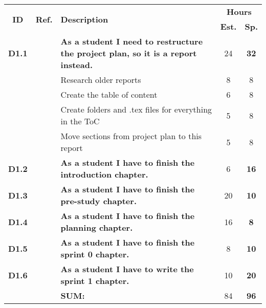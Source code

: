 \label{tab:sprint1Documentationstories}
\def\arraystretch{1.25}
 
\begin{longtable}{ccXcc}

\toprule[0.5mm]
\multirow{2}{*}{\textbf{ID}} &
\multirow{2}{*}{\textbf{Ref.}} & \multirow{2}{*}{\textbf{Description}} & \multicolumn{2}{c}{\textbf{Hours}} \\
 					& & & \textbf{Est.} & \textbf{Sp.} \\
\midrule
\textbf{D1.1} 	&& {\bf As a student I need to restructure the project plan, so it is a report instead.}	& 	 	24	& \textbf{32} \\
			&& Research older reports 										& 8	& 8\\
			&& Create the table of content 									& 6 & 8\\
			&& Create folders and .tex files for everything in the ToC 		& 5 & 8\\
			&& Move sections from project plan to this report 				& 5 & 8\\

\textbf{D1.2} 	&& {\bf As a student I have to finish the introduction chapter.} 							& 		6	& \textbf{16} \\

\textbf{D1.3} 	&& {\bf As a student I have to finish the pre-study chapter.} 								& 		20	& \textbf{10} \\

\textbf{D1.4} 	&& {\bf As a student I have to finish the planning chapter.} 								& 		16	& \textbf{8} \\

\textbf{D1.5} 	&& {\bf As a student I have to finish the sprint 0 chapter.} 								& 		8	& \textbf{10} \\

\textbf{D1.6} 	&& {\bf As a student I have to write the sprint 1 chapter.} 								& 		10	& \textbf{20} \\							
				
\hline
				&& \textbf{SUM:}		&		84	& \textbf{96}
 \\																			
\bottomrule[0.5mm]
\end{longtable}
